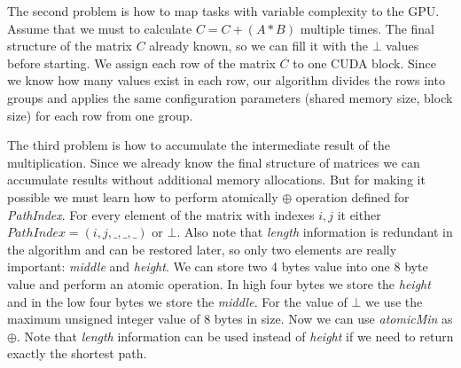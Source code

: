 The second problem is how to map tasks with variable complexity to the GPU. Assume that we must to calculate $C = C + (A * B)$ multiple times. The final structure of the matrix $C$ already known, so we can fill it with the $\bot$ values before starting. We assign each row of the matrix $C$ to one CUDA block. Since we know how many values exist in each row, our algorithm divides the rows into groups and applies the same configuration parameters (shared memory size, block size) for each row from one group.
 
The third problem is how to accumulate the intermediate result of the multiplication. Since we already know the final structure of matrices we can accumulate results without additional memory allocations. But for making it possible we must learn how to perform atomically $\oplus$ operation defined for \textit{PathIndex}. For every element of the matrix with indexes $i,j$ it either $PathIndex = (i,j,\_,\_,\_)$ or $\bot$. Also note that \textit{length} information is redundant in the algorithm and can be restored later, so only two elements are really important: \textit{middle} and \textit{height}. We can store two 4 bytes value into one 8 byte value and perform an atomic operation. In high four bytes we store the \textit{height} and in the low four bytes we store the \textit{middle}. For the value of $\bot$ we use the maximum unsigned integer value of 8 bytes in size. Now we can use \textit{atomicMin} as $\oplus$. Note that \textit{length} information can be used instead of \textit{height} if we need to return exactly the shortest path.